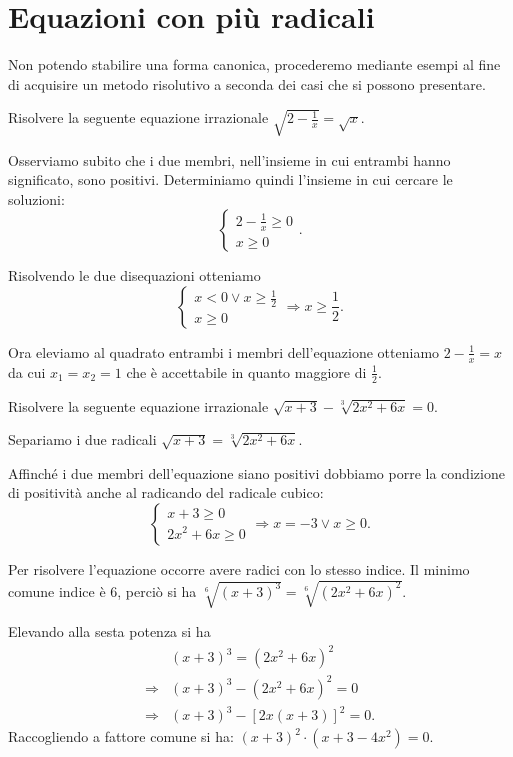 \section{Equazioni con più radicali}
Non potendo stabilire una forma canonica, procederemo mediante esempi al fine di acquisire un metodo risolutivo a seconda dei casi che si possono presentare.
\begin{exrig}

\begin{esempio}
Risolvere la seguente equazione irrazionale $\sqrt{2-\frac 1 x}=\sqrt x$.

Osserviamo subito che i due membri, nell’insieme in cui entrambi hanno significato, sono positivi.
Determiniamo quindi l’insieme in cui cercare le soluzioni: 
\[\left\{\begin{array}{l}{2-\frac 1 x\ge 0}\\{x\ge 0}\end{array}\right..\]

Risolvendo le due disequazioni otteniamo 
\[\left\{\begin{array}{l}x<0\vee x\ge \frac 1 2\\{x\ge 0}\end{array}\right.\Rightarrow x\ge \frac 1 2.\]

Ora eleviamo al quadrato entrambi i membri dell'equazione otteniamo $2-\frac 1 x=x$ da cui $x_1=x_2=1$ che è accettabile in quanto maggiore di $\frac 1 2$.
\end{esempio}
\begin{esempio}
Risolvere la seguente equazione irrazionale $\sqrt{x+3}-\sqrt[3]{2x^2+6x}=0$.

Separiamo i due radicali $\sqrt{x+3}=\sqrt[3]{2x^2+6x}$.

Affinché i due membri dell’equazione siano positivi dobbiamo porre la condizione di positività anche al radicando del radicale cubico: 
\[\left\{\begin{array}{l}{x+3\ge 0}\\{2x^2+6x\ge 0}\end{array}\right.\Rightarrow x=-3\vee x\ge 0.\]

Per risolvere l’equazione occorre avere radici con lo stesso indice. Il minimo comune indice è $6$, perciò si ha $\sqrt[6]{(x+3)^3}=\sqrt[6]{\left(2x^2+6x\right)^2}$.

Elevando alla sesta potenza si ha 
\begin{align*}
&(x+3)^3=\left(2x^2+6x\right)^2\\
\Rightarrow & (x+3)^3-\left(2x^2+6x\right)^2=0\\
\Rightarrow & (x+3)^3-[2x(x+3)]^2=0.
\end{align*}
Raccogliendo a fattore comune si ha: $(x+3)^2\cdot \left(x+3-4x^2\right)=0$.


\end{esempio}
\end{exrig}
